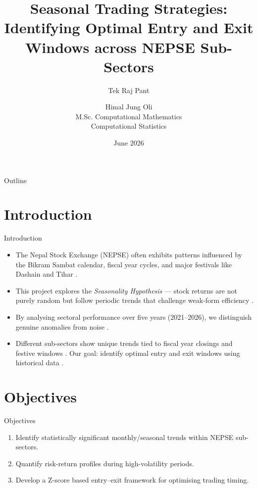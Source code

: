 \documentclass[10pt, aspectratio=169]{beamer}
\title[Seasonal Trading Strategies]{Seasonal Trading Strategies: Identifying Optimal Entry and Exit Windows across NEPSE Sub-Sectors}
\author[Tek Raj Pant, Himal Jung Oli]{Tek Raj Pant \and Himal Jung Oli \\ M.Sc. Computational Mathematics \\ Computational Statistics}
\institute[Kathmandu University]{Department of Mathematics \\ School of Science \\ Kathmandu University}
\date{June 2026}
\begin{document}
\begin{frame}
\titlepage
\end{frame}

\begin{frame}{Outline}
\tableofcontents
\end{frame}

\section{Introduction}

\begin{frame}{Introduction}
\begin{itemize}
    \item The Nepal Stock Exchange (NEPSE) often exhibits patterns influenced by the Bikram Sambat calendar, fiscal year cycles, and major festivals like Dashain and Tihar \cite{shrestha2023seasonal}.
    \item This project explores the \textit{Seasonality Hypothesis} --- stock returns are not purely random but follow periodic trends that challenge weak-form efficiency \cite{joshi2025broad}.
    \item By analysing sectoral performance over five years (2021--2026), we distinguish genuine anomalies from noise \cite{basnet2022efficient}.
    \item Different sub-sectors show unique trends tied to fiscal year closings and festive windows \cite{gurung2024fiscal}. Our goal: identify optimal entry and exit windows using historical data \cite{adhikari2024calendar, sharma2021investor}.
\end{itemize}
\end{frame}

\section{Objectives}

\begin{frame}{Objectives}
\begin{enumerate}
    \item Identify statistically significant monthly/seasonal trends within NEPSE sub-sectors.
    \item Quantify risk-return profiles during high-volatility periods.
    \item Develop a Z-score based entry--exit framework for optimising trading timing.
\end{enumerate}
\end{frame}
\end{document}
